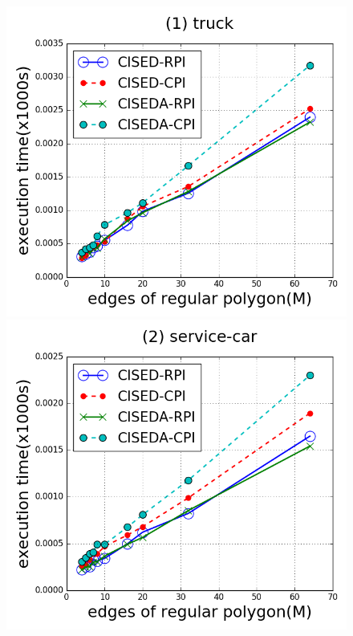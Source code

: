 \begin{figure}[tb!]
\centering
\includegraphics[scale = 0.250]{figures/Exp-M-e-200-time-truck.png}
\includegraphics[scale = 0.250]{figures/Exp-M-e-200-time-service.png}

\end{figure}

